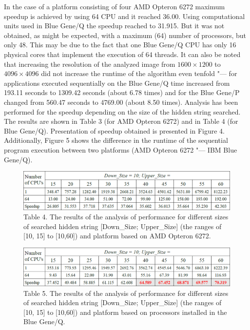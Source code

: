 \documentclass[10pt, a5paper]{article}
\begin{document}
In the case of a platform consisting of four AMD Opteron 6272 maximum speedup is achieved by using 64 CPU and it reached 36.00. Using computational units used in Blue Gene/Q the speedup reached to 31.915. But it was not obtained, as might be expected, with a maximum (64) number of processors, but only 48. This may be due to the fact that one Blue Gene/Q CPU has only 16 physical cores that implement the execution of 64 threads.
It can also be noted that increasing the resolution of the analyzed image from $1600\times1200$ to $4096\times4096$ did not increase the runtime of the algorithm even tenfold "--- for applications executed sequentially on the Blue Gene/Q time increased from 193.11 seconds to 1309.42 seconds (about 6.78 times) and for the Blue Gene/P changed from 560.47 seconds to 4769.00 (about 8.50 times). Analysis has been performed for the speedup depending on the size of the hidden string searched. The results are shown in Table 3 (for AMD Opteron 6272) and in Table 4 (for Blue Gene/Q). Presentation of speedup obtained is presented in Figure 4. Additionally, Figure 5 shows the difference in the runtime of the sequential program execution between two platforms (AMD Opteron 6272 "--- IBM Blue Gene/Q).

\begin{figure}[h!]
  \centering
  \includegraphics[width=\textwidth]{103_2014_w_Kwiatkowska_perf1.png}
  Table 4. The results of the analysis of performance for different sizes of searched hidden string [Down\_Size; Upper\_Size] (the ranges of [10, 15] to [10,60]) and platform based on AMD Opteron 6272.
\end{figure}
\begin{figure}[h!]
  \centering
  \includegraphics[width=\textwidth]{103_2014_w_Kwiatkowska_perf2.png}
  Table 5. The results of the analysis of performance for different sizes of searched hidden string [Down\_Size; Upper\_Size] (the ranges of [10, 15] to [10,60]) and platform based on processors installed in the Blue Gene/Q.
\end{figure}
\end{document}
